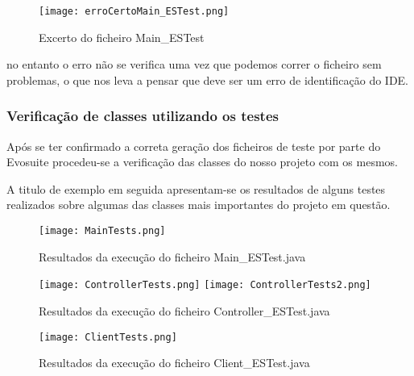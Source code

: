 \begin{figure}[H]

  \centering

  \texttt{[image: erroCertoMain\_ESTest.png]}

  \caption {Excerto do ficheiro Main\_ESTest}

  \label {fig38}

\end{figure}

\par no entanto o erro não se verifica uma vez que podemos correr o ficheiro sem problemas, o que nos leva a pensar que deve ser um erro de identificação do IDE.

\subsubsection{Verificação de classes utilizando os testes}

\par Após se ter confirmado a correta geração dos ficheiros de teste por parte do Evosuite procedeu-se a verificação das classes do nosso projeto com os mesmos.
\par A titulo de exemplo em seguida apresentam-se os resultados de alguns testes realizados sobre algumas das classes mais importantes do projeto em questão.

\begin{figure}[H]

  \centering

  \texttt{[image: MainTests.png]}

  \caption {Resultados da execução do ficheiro Main\_ESTest.java}

  \label {fig39}

\end{figure}
\begin{figure}[H]

  \centering

  \texttt{[image: ControllerTests.png]}
  \texttt{[image: ControllerTests2.png]}
  \caption {Resultados da execução do ficheiro Controller\_ESTest.java}

  \label {fig40}

\end{figure}
\begin{figure}[H]

  \centering

  \texttt{[image: ClientTests.png]}

  \caption {Resultados da execução do ficheiro Client\_ESTest.java}

  \label {fig41}

\end{figure}

